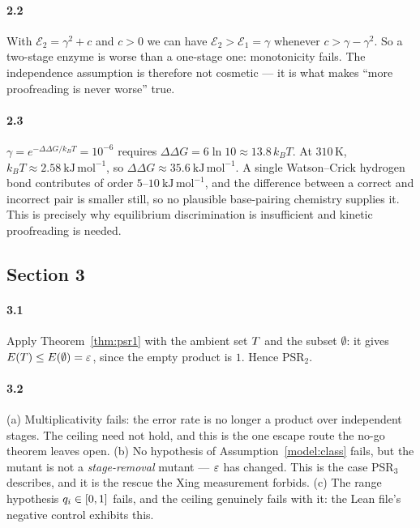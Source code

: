 \paragraph{2.2}
With $\mathcal{E}_2 = \gamma^2 + c$ and $c > 0$ we can have
$\mathcal{E}_2 > \mathcal{E}_1 = \gamma$ whenever $c > \gamma - \gamma^2$. So a
two-stage enzyme is worse than a one-stage one: monotonicity fails. The
independence assumption is therefore not cosmetic --- it is what makes
``more proofreading is never worse'' true.

\paragraph{2.3}
$\gamma = e^{-\Delta\Delta G/k_BT} = 10^{-6}$ requires
$\Delta\Delta G = 6\ln 10 \approx 13.8\,k_BT$. At $310$\,K,
$k_BT \approx 2.58\ \mathrm{kJ\,mol^{-1}}$, so
$\Delta\Delta G \approx 35.6\ \mathrm{kJ\,mol^{-1}}$. A single Watson--Crick
hydrogen bond contributes of order $5$--$10\ \mathrm{kJ\,mol^{-1}}$, and the
difference between a correct and incorrect pair is smaller still, so no plausible
base-pairing chemistry supplies it. This is precisely why equilibrium
discrimination is insufficient and kinetic proofreading is needed.

\subsection*{Section 3}

\paragraph{3.1}
Apply Theorem~\ref{thm:psr1} with the ambient set $T$ and the subset
$\emptyset$: it gives $E(T) \le E(\emptyset) = \varepsilon$, since the
empty product is $1$. Hence PSR$_2$.

\paragraph{3.2}
(a) Multiplicativity fails: the error rate is no longer a product over
independent stages. The ceiling need not hold, and this is the one escape route
the no-go theorem leaves open.
(b) No hypothesis of Assumption~\ref{model:class} fails, but the mutant is not a
\emph{stage-removal} mutant --- $\varepsilon$ has changed. This is the case PSR$_3$
describes, and it is the rescue the Xing measurement forbids.
(c) The range hypothesis $q_i \in [0,1]$ fails, and the ceiling genuinely
fails with it: the Lean file's negative control exhibits this.

